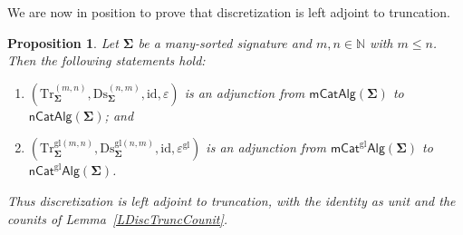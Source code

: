 \documentclass[a4paper, reqno
]{amsart}
\newcommand{\sig}[1]{\mathbf{#1}}             %
\newcommand{\id}{\mathrm{id}}
\newcommand{\gl}{\mathrm{gl}}                %
\newcommand{\Ds}{\mathrm{Ds}}
\newcommand{\Tr}{\mathrm{Tr}}
\theoremstyle{plain}
\newtheorem{proposition}[theorem]{Proposition}
\theoremstyle{definition}
\begin{document}
We are now in position to prove that discretization is left adjoint to truncation.

\begin{proposition}\label{PDiscTruncAdj}
Let $\sig{\Sigma}$ be a many-sorted signature and $m,n\in\mathbb{N}$ with $m\leq n$.
Then the following statements hold:
\begin{enumerate}
\item $(\Tr^{(m,n)}_{\sig{\Sigma}},\Ds^{(n,m)}_{\sig{\Sigma}},\id,\varepsilon)$ is an adjunction from $\mathsf{mCatAlg}(\sig{\Sigma})$ to $\mathsf{nCatAlg}(\sig{\Sigma})$; and
\item $(\Tr^{\gl(m,n)}_{\sig{\Sigma}},\Ds^{\gl(n,m)}_{\sig{\Sigma}},\id,\varepsilon^{\gl})$ is an adjunction from $\mathsf{mCat}^{\gl}\mathsf{Alg}(\sig{\Sigma})$ to $\mathsf{nCat}^{\gl}\mathsf{Alg}(\sig{\Sigma})$.
\end{enumerate}
Thus discretization is left adjoint to truncation, with the identity as unit and the counits of Lemma~\ref{LDiscTruncCounit}.
\end{proposition}
\end{document}
